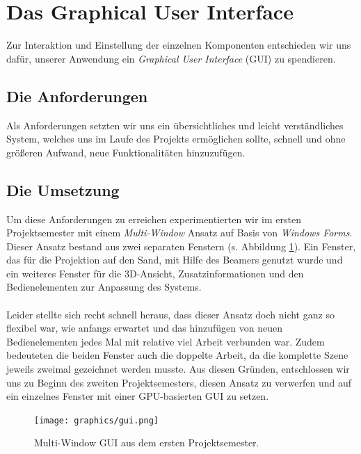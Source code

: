 \section{Das Graphical User Interface}
\begin{Spacing}{\mylinespace}

Zur Interaktion und Einstellung der einzelnen Komponenten entschieden wir uns dafür, unserer Anwendung ein \textit{Graphical User Interface} (GUI) zu spendieren. 

\subsection{Die Anforderungen}

Als Anforderungen setzten wir uns ein übersichtliches und leicht verständliches System, welches uns im Laufe des Projekts ermöglichen sollte, schnell und ohne größeren Aufwand, neue Funktionalitäten hinzuzufügen.  

\subsection{Die Umsetzung}

Um diese Anforderungen zu erreichen experimentierten wir im ersten Projektsemester mit einem \textit{Multi-Window} Ansatz auf Basis von \textit{Windows Forms}. Dieser Ansatz bestand aus zwei separaten Fenstern (s. Abbildung \ref{fig:GUIOld}). Ein Fenster, das für die Projektion auf den Sand, mit Hilfe des Beamers genutzt wurde und ein weiteres Fenster für die 3D-Ansicht, Zusatzinformationen und den Bedienelementen zur Anpassung des Systems.
\\\\
Leider stellte sich recht schnell heraus, dass dieser Ansatz doch nicht ganz so flexibel war, wie anfangs erwartet und das hinzufügen von neuen Bedienelementen jedes Mal mit relative viel Arbeit verbunden war. Zudem bedeuteten die beiden Fenster auch die doppelte Arbeit, da die komplette Szene jeweils zweimal gezeichnet werden musste. Aus diesen Gründen, entschlossen wir uns zu Beginn des zweiten Projektsemesters, diesen Ansatz zu verwerfen und auf ein einzelnes Fenster mit einer GPU-basierten GUI zu setzen.

\begin{figure}[h!]
	\centering
	\vspace*{10px}
	\texttt{[image: graphics/gui.png]}	
	\caption{Multi-Window GUI aus dem ersten Projektsemester.}
	\label{fig:GUIOld}
\end{figure}


\end{Spacing}
